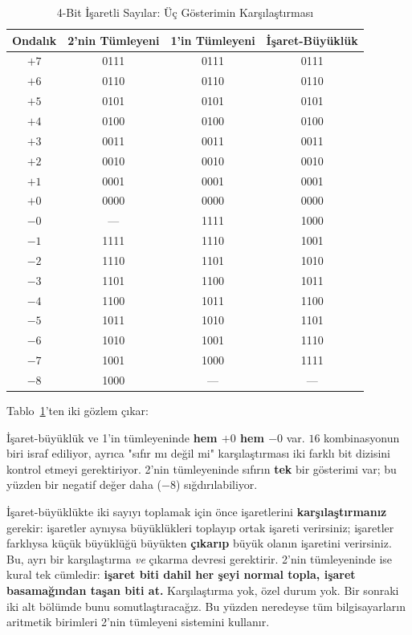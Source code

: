 \begin{table}[h]
\centering
\begin{tabular}{cccc}
\toprule
Ondalık & 2'nin Tümleyeni & 1'in Tümleyeni & İşaret-Büyüklük \\
\midrule
$+7$ & 0111 & 0111 & 0111 \\
$+6$ & 0110 & 0110 & 0110 \\
$+5$ & 0101 & 0101 & 0101 \\
$+4$ & 0100 & 0100 & 0100 \\
$+3$ & 0011 & 0011 & 0011 \\
$+2$ & 0010 & 0010 & 0010 \\
$+1$ & 0001 & 0001 & 0001 \\
$+0$ & 0000 & 0000 & 0000 \\
$-0$ & --- & 1111 & 1000 \\
$-1$ & 1111 & 1110 & 1001 \\
$-2$ & 1110 & 1101 & 1010 \\
$-3$ & 1101 & 1100 & 1011 \\
$-4$ & 1100 & 1011 & 1100 \\
$-5$ & 1011 & 1010 & 1101 \\
$-6$ & 1010 & 1001 & 1110 \\
$-7$ & 1001 & 1000 & 1111 \\
$-8$ & 1000 & --- & --- \\
\bottomrule
\end{tabular}
\caption{4-Bit İşaretli Sayılar: Üç Gösterimin Karşılaştırması}
\label{tab:isaretli-4bit}
\end{table}

Tablo~\ref{tab:isaretli-4bit}'ten iki gözlem çıkar:

\begin{bilginot}
İşaret-büyüklük ve 1'in tümleyeninde \textbf{hem $+0$ hem $-0$} var. $16$ kombinasyonun
biri israf ediliyor, ayrıca "sıfır mı değil mi" karşılaştırması iki farklı bit dizisini
kontrol etmeyi gerektiriyor. 2'nin tümleyeninde sıfırın \textbf{tek} bir gösterimi var; bu
yüzden bir negatif değer daha ($-8$) sığdırılabiliyor.
\end{bilginot}

\begin{bilginot}
İşaret-büyüklükte iki sayıyı toplamak için önce işaretlerini \textbf{karşılaştırmanız}
gerekir: işaretler aynıysa büyüklükleri toplayıp ortak işareti verirsiniz; işaretler
farklıysa küçük büyüklüğü büyükten \textbf{çıkarıp} büyük olanın işaretini verirsiniz. Bu,
ayrı bir karşılaştırma \emph{ve} çıkarma devresi gerektirir. 2'nin tümleyeninde ise kural tek
cümledir: \textbf{işaret biti dahil her şeyi normal topla, işaret basamağından taşan biti
at.} Karşılaştırma yok, özel durum yok. Bir sonraki iki alt bölümde bunu somutlaştıracağız.
Bu yüzden neredeyse tüm bilgisayarların aritmetik birimleri 2'nin tümleyeni sistemini kullanır.
\end{bilginot}

